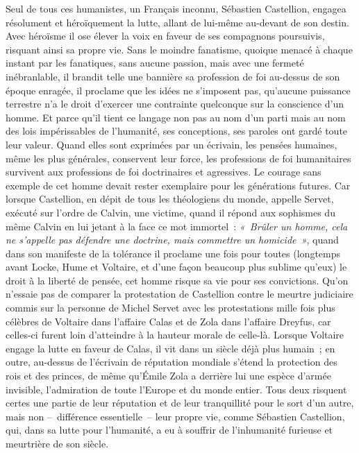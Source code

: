 \documentclass[french,twoside]{book} %
\begin{document}
Seul de tous ces humanistes, un Français inconnu, Sébastien Castellion, engagea résolument et héroïquement la lutte, allant de lui-même au-devant de son destin. Avec héroïsme il ose élever la voix en faveur de ses compagnons poursuivis, risquant ainsi sa propre vie. Sans le moindre fanatisme, quoique menacé à chaque instant par les fanatiques, sans aucune passion, mais avec une fermeté inébranlable, il brandit telle une bannière sa profession de foi au-dessus de son époque enragée, il proclame que les idées ne s’imposent pas, qu’aucune puissance terrestre n’a le droit d’exercer une contrainte quelconque sur la conscience d’un homme. Et parce qu’il tient ce langage non pas au nom d’un parti mais au nom des lois impérissables de l’humanité, ses conceptions, ses paroles ont gardé toute leur valeur. Quand elles sont exprimées par un écrivain, les pensées humaines, même les plus générales, conservent leur force, les professions de foi humanitaires survivent aux professions de foi doctrinaires et agressives. Le courage sans exemple de cet homme devait rester exemplaire pour les générations futures. Car lorsque Castellion, en dépit de tous les théologiens du monde, appelle Servet, exécuté sur l’ordre de Calvin, une victime, quand il répond aux sophismes du même Calvin en lui jetant à la face ce mot immortel : \emph{« Brûler un homme, cela ne s’appelle pas défendre une doctrine, mais commettre un homicide »}, quand dans son manifeste de la tolérance il proclame une fois pour toutes (longtemps avant Locke, Hume et Voltaire, et d’une façon beaucoup plus sublime qu’eux) le droit à la liberté de pensée, cet homme risque sa vie pour ses convictions. Qu’on n’essaie pas de comparer la protestation de Castellion contre le meurtre judiciaire commis sur la personne de Michel Servet avec les protestations mille fois plus célèbres de Voltaire dans l’affaire Calas et de Zola dans l’affaire Dreyfus, car celles-ci furent loin d’atteindre à la hauteur morale de celle-là. Lorsque Voltaire engage la lutte en faveur de Calas, il vit dans un siècle déjà plus humain ; en outre, au-dessus de l’écrivain de réputation mondiale s’étend la protection des rois et des princes, de même qu’Émile Zola a derrière lui une espèce d’armée invisible, l’admiration de toute l’Europe et du monde entier. Tous deux risquent certes une partie de leur réputation et de leur tranquillité pour le sort d’un autre, mais non – différence essentielle – leur propre vie, comme Sébastien Castellion, qui, dans sa lutte pour l’humanité, a eu à souffrir de l’inhumanité furieuse et meurtrière de son siècle.\par
\end{document}

